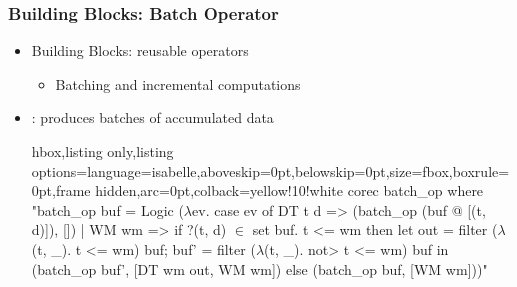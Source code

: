 \documentclass[aspectratio=169,10pt]{beamer}
\begin{document}
\begin{frame}[fragile]
  \frametitle{Building Blocks: Batch Operator}
  \begin{itemize}
          \item Building Blocks: reusable operators
          \begin{itemize}
            \item Batching and incremental computations
          \end{itemize}
          \pause
    \item {}: produces batches of accumulated data
\vspace*{-1ex}
\begin{tcblisting}{hbox,listing only,listing options={language=isabelle,aboveskip=0pt,belowskip=0pt},size=fbox,boxrule=0pt,frame hidden,arc=0pt,colback=yellow!10!white}
corec batch_op where
  "batch_op buf = Logic ($\lambda$ev. case ev of DT t d => (batch_op (buf @ [(t, d)]), [])
  | WM wm => if ?(t, d) $\in$ set buf. t <= wm
      then let out = filter ($\lambda$(t, _). t <= wm) buf;
                  buf' = filter ($\lambda$(t, _). \<not> t <= wm) buf
             in (batch_op buf', [DT wm out, WM wm])
      else (batch_op buf, [WM wm]))"
\end{tcblisting}
\vspace*{-1ex}
  \end{itemize}
\end{frame}
\end{document}
